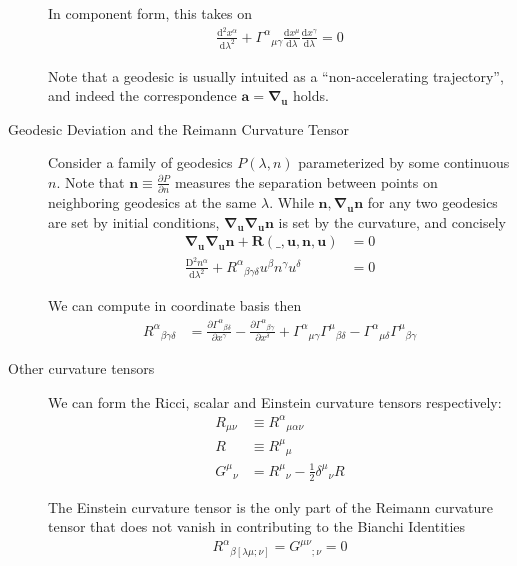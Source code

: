 \documentclass[12pt]{report}
\newcommand{\rd}[2]{\frac{\mathrm{d}#1}{\mathrm{d}#2}}
\newcommand{\pd}[2]{\frac{\partial#1}{\partial#2}}
\newcommand{\rtd}[2]{\frac{\mathrm{d}^2#1}{\mathrm{d}#2^2}}
\newcommand{\bm}[1]{\boldsymbol{\mathbf{#1}}}
\begin{document}
\begin{description}
        In component form, this takes on
        \begin{align}
            \rtd{x^\alpha}{\lambda} + {\Gamma^\alpha}_{\mu\gamma}
                \rd{x^\mu}{\lambda}\rd{x^\gamma}{\lambda} = 0
        \end{align}

        Note that a geodesic is usually intuited as a ``non-accelerating
        trajectory'', and indeed the correspondence $\bm{a} =
        \bm{\nabla}_{\bm{u}}$ holds.

    \item[Geodesic Deviation and the Reimann Curvature Tensor] Consider a family
        of geodesics $P(\lambda, n)$ parameterized by some continuous $n$. Note
        that $\bm{n} \equiv \pd{P}{n}$ measures the separation between points on
        neighboring geodesics at the same $\lambda$. While $\bm{n},
        \bm{\nabla}_{\bm{u}}\bm{n}$ for any two geodesics are set by initial
        conditions, $\bm{\nabla}_{\bm{u}}\bm{\nabla}_{\bm{u}} \bm{n}$ is set by
        the curvature, and concisely
        \begin{align}
            \bm{\nabla}_{\bm{u}}\bm{\nabla}_{\bm{u}} \bm{n} + \bm{R}
                (\_, \bm{u}, \bm{n}, \bm{u}) &= 0\\
            \frac{\mathrm{D}^2 n^\alpha}{\mathrm{d}\lambda^2} +
                {R^\alpha}_{\beta\gamma\delta} u^\beta n^\gamma u^\delta &= 0
        \end{align}

        We can compute in coordinate basis then
        \begin{align*}
            {R^\alpha}_{\beta\gamma\delta} &=
                \pd{{\Gamma^\alpha}_{\beta\delta}}{x^\gamma} -
                \pd{{\Gamma^\alpha}_{\beta\gamma}}{x^\delta} +
                {\Gamma^\alpha}_{\mu\gamma} {\Gamma^\mu}_{\beta\delta} -
                {\Gamma^\alpha}_{\mu\delta} {\Gamma^\mu}_{\beta\gamma}
        \end{align*}

    \item[Other curvature tensors] We can form the Ricci, scalar and Einstein
        curvature tensors respectively:
        \begin{align}
            R_{\mu\nu} &\equiv {R^\alpha}_{\mu\alpha\nu}\\
            R &\equiv {R^\mu}_\mu\\
            {G^\mu}_{\nu} &= {R^\mu}_{\nu} - \frac{1}{2} {\delta^\mu}_\nu R
        \end{align}

        The Einstein curvature tensor is the only part of the Reimann curvature
        tensor that does not vanish in contributing to the Bianchi Identities
        \begin{align*}
            {R^\alpha}_{\beta[\lambda\mu;\nu]} = {G^{\mu\nu}}_{;\nu} = 0
        \end{align*}
\end{description}
\end{document}
